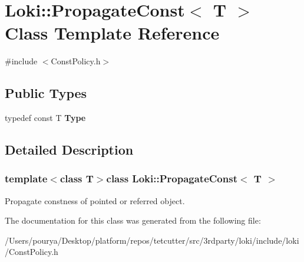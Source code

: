 \hypertarget{structLoki_1_1PropagateConst}{}\section{Loki\+:\+:Propagate\+Const$<$ T $>$ Class Template Reference}
\label{structLoki_1_1PropagateConst}


{\ttfamily \#include $<$Const\+Policy.\+h$>$}

\subsection*{Public Types}
\begin{DoxyCompactItemize}
\item 
\hypertarget{structLoki_1_1PropagateConst_a2e0a4db9678250212888ce8c07f6ff6f}{}typedef const T {\bfseries Type}\label{structLoki_1_1PropagateConst_a2e0a4db9678250212888ce8c07f6ff6f}

\end{DoxyCompactItemize}


\subsection{Detailed Description}
\subsubsection*{template$<$class T$>$class Loki\+::\+Propagate\+Const$<$ T $>$}

Propagate constness of pointed or referred object. 

The documentation for this class was generated from the following file\+:\begin{DoxyCompactItemize}
\item 
/\+Users/pourya/\+Desktop/platform/repos/tetcutter/src/3rdparty/loki/include/loki/Const\+Policy.\+h\end{DoxyCompactItemize}
